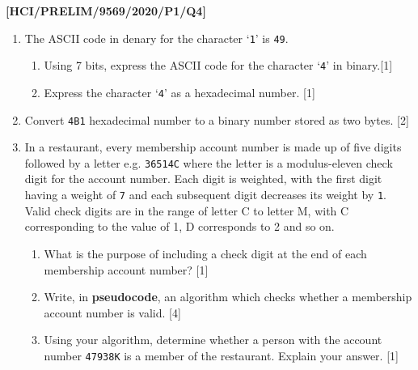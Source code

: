 \item \textbf{{[}HCI/PRELIM/9569/2020/P1/Q4{]} }
\begin{enumerate}
\item The ASCII code in denary for the character \textquoteleft \texttt{1}\textquoteright{}
is \texttt{49}.
\begin{enumerate}
\item Using 7 bits, express the ASCII code for the character \textquoteleft \texttt{4}\textquoteright{}
in binary.\hfill{}{[}1{]}
\item Express the character \textquoteleft \texttt{4}\textquoteright{} as
a hexadecimal number. \hfill{}{[}1{]}
\end{enumerate}
\item Convert \texttt{4B1} hexadecimal number to a binary number stored
as two bytes. \hfill{}{[}2{]}
\item In a restaurant, every membership account number is made up of five
digits followed by a letter e.g. \texttt{36514C} where the letter
is a modulus-eleven check digit for the account number. Each digit
is weighted, with the first digit having a weight of \texttt{7} and
each subsequent digit decreases its weight by \texttt{1}. Valid check
digits are in the range of letter C to letter M, with C corresponding
to the value of 1, D corresponds to 2 and so on.
\begin{enumerate}
\item What is the purpose of including a check digit at the end of each
membership account number? \hfill{}{[}1{]}
\item Write, in \textbf{pseudocode}, an algorithm which checks whether a
membership account number is valid. \hfill{}{[}4{]}
\item Using your algorithm, determine whether a person with the account
number \texttt{47938K} is a member of the restaurant. Explain your
answer. \hfill{}{[}1{]}
\end{enumerate}
\end{enumerate}
